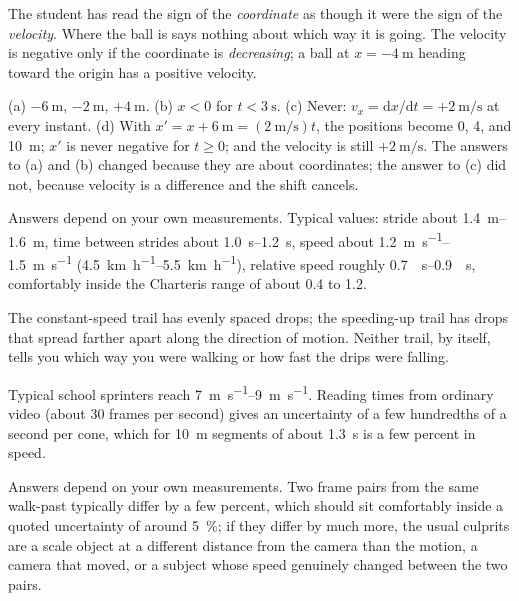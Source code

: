 \documentclass[11pt,twoside,openany]{book}
\newcommand{\dd}{\mathrm{d}}
\begin{document}
\begin{description}[leftmargin=2.6em,itemsep=3pt,style=sameline]
  \item[1.66] The student has read the sign of the \emph{coordinate} as though it were the sign of the \emph{velocity}. Where the ball is says nothing about which way it is going. The velocity is negative only if the coordinate is \emph{decreasing}; a ball at $x = \SI{-4}{\metre}$ heading toward the origin has a positive velocity.
  \item[1.67] (a) $\SI{-6}{\metre}$, $\SI{-2}{\metre}$, $+\SI{4}{\metre}$. (b) $x<0$ for $t < \SI{3}{\second}$. (c) Never: $v_x = \dd x/\dd t = +\SI{2}{\metre\per\second}$ at every instant. (d) With $x' = x + \SI{6}{\metre} = (\SI{2}{\metre\per\second})t$, the positions become \SI{0}{}, \SI{4}{}, and \SI{10}{\metre}; $x'$ is never negative for $t \ge 0$; and the velocity is still $+\SI{2}{\metre\per\second}$. The answers to (a) and (b) changed because they are about coordinates; the answer to (c) did not, because velocity is a difference and the shift cancels.
  \item[1.68] Answers depend on your own measurements. Typical values: stride about \SIrange{1.4}{1.6}{\metre}, time between strides about \SIrange{1.0}{1.2}{\second}, speed about \SIrange{1.2}{1.5}{\metre\per\second} (\SIrange{4.5}{5.5}{\kilo\metre\per\hour}), relative speed roughly \SIrange{0.7}{0.9}{\per\second}, comfortably inside the Charteris range of about \num{0.4} to \num{1.2}.
  \item[1.69] The constant-speed trail has evenly spaced drops; the speeding-up trail has drops that spread farther apart along the direction of motion. Neither trail, by itself, tells you which way you were walking or how fast the drips were falling.
  \item[1.70] Typical school sprinters reach \SIrange{7}{9}{\metre\per\second}. Reading times from ordinary video (about \num{30} frames per second) gives an uncertainty of a few hundredths of a second per cone, which for \SI{10}{\metre} segments of about \SI{1.3}{\second} is a few percent in speed.
  \item[1.72] Answers depend on your own measurements. Two frame pairs from the same walk-past typically differ by a few percent, which should sit comfortably inside a quoted uncertainty of around \SI{5}{\percent}; if they differ by much more, the usual culprits are a scale object at a different distance from the camera than the motion, a camera that moved, or a subject whose speed genuinely changed between the two pairs.
\end{description}
\end{document}
